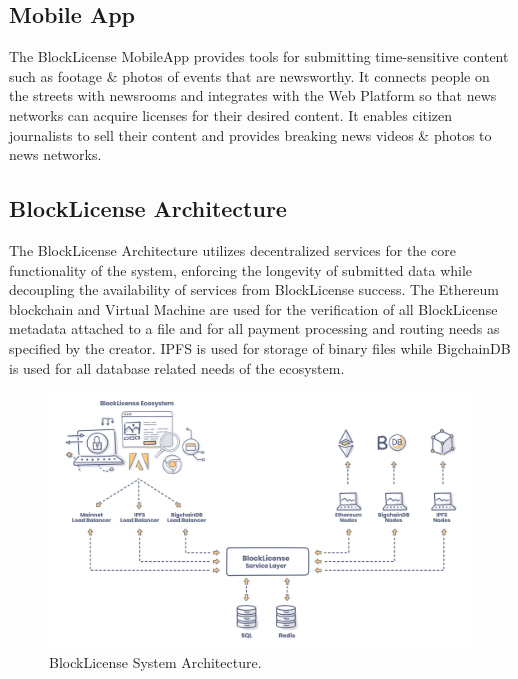 \subsection{Mobile App}

The BlockLicense MobileApp provides tools for submitting time-sensitive content such as footage \& photos of events that are newsworthy. It connects people on the streets with newsrooms and integrates with the Web Platform so that news networks can acquire licenses for their desired content. It enables citizen journalists to sell their content and provides breaking news videos \& photos to news networks.


\subsection{BlockLicense Architecture}

The BlockLicense Architecture utilizes decentralized services for the core functionality of the system, enforcing the longevity of submitted data while decoupling the availability of services from BlockLicense success. The Ethereum blockchain and Virtual Machine are used for the verification of all BlockLicense metadata attached to a file and for all payment processing and routing needs as specified by the creator. IPFS \cite{ipfs} is used for storage of binary files while BigchainDB \cite{bigchaindb} is used for all database related needs of the ecosystem.

\begin{figure}[h]
\centering
\begin{minipage}{1\textwidth}
  \centering
  \includegraphics[width=1\linewidth]{./figures/fig7.png}
  \caption{BlockLicense System Architecture.}
  \label{fig:system}
\end{minipage}%
\end{figure}
